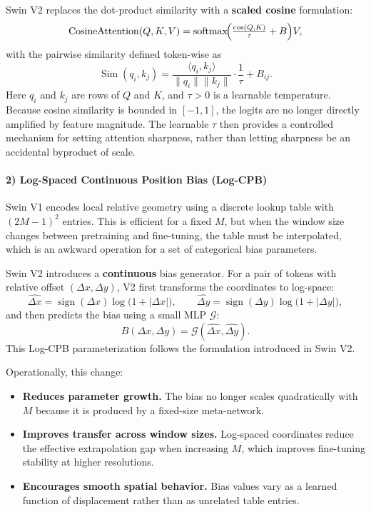 \noindent
Swin V2 replaces the dot-product similarity with a \textbf{scaled cosine} formulation:
\[
\operatorname{CosineAttention}(Q,K,V)
=
\operatorname{softmax}\!\Bigl(\tfrac{\operatorname{cos}(Q,K)}{\tau} + B\Bigr)V,
\]
with the pairwise similarity defined token-wise as
\[
\operatorname{Sim}(q_i,k_j)
=
\frac{\langle q_i,k_j\rangle}{\|q_i\|\|k_j\|}\cdot \frac{1}{\tau}
+
B_{ij}.
\]
Here \(q_i\) and \(k_j\) are rows of \(Q\) and \(K\), and \(\tau>0\) is a learnable temperature.
Because cosine similarity is bounded in \([-1,1]\), the logits are no longer directly amplified by
feature magnitude.
The learnable \(\tau\) then provides a controlled mechanism for setting attention sharpness, rather than
letting sharpness be an accidental byproduct of scale.

\paragraph{2) Log-Spaced Continuous Position Bias (Log-CPB)}
\noindent
Swin V1 encodes local relative geometry using a discrete lookup table with \((2M-1)^2\) entries.
This is efficient for a fixed \(M\), but when the window size changes between pretraining and
fine-tuning, the table must be interpolated, which is an awkward operation for a set of categorical
bias parameters.

\noindent
Swin V2 introduces a \textbf{continuous} bias generator.
For a pair of tokens with relative offset \((\Delta x,\Delta y)\), V2 first transforms the coordinates to
log-space:
\[
\hat{\Delta x} =
\operatorname{sign}(\Delta x)\log\!\bigl(1+|\Delta x|\bigr),
\qquad
\hat{\Delta y} =
\operatorname{sign}(\Delta y)\log\!\bigl(1+|\Delta y|\bigr),
\]
and then predicts the bias using a small MLP \(\mathcal{G}\):
\[
B(\Delta x,\Delta y) = \mathcal{G}(\hat{\Delta x},\hat{\Delta y}).
\]
This Log-CPB parameterization follows the formulation introduced in Swin V2.

\noindent
Operationally, this change:
\begin{itemize}
	\item \textbf{Reduces parameter growth.} The bias no longer scales quadratically with \(M\) because it is produced by a fixed-size meta-network.
	\item \textbf{Improves transfer across window sizes.} Log-spaced coordinates reduce the effective extrapolation gap when increasing \(M\), which improves fine-tuning stability at higher resolutions.
	\item \textbf{Encourages smooth spatial behavior.} Bias values vary as a learned function of displacement rather than as unrelated table entries.
\end{itemize}

